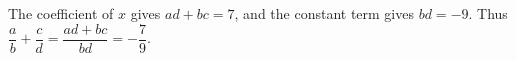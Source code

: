 The coefficient of $ x $ gives $ ad+bc=7 $, and the constant term gives $ bd=-9 $. Thus $\dfrac{a}{b}+\dfrac{c}{d}=\dfrac{ad+bc}{bd}=\boxed{-\dfrac{7}{9}}$.
